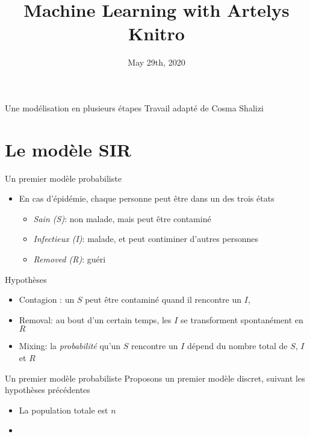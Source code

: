 \documentclass[10pt]{beamer}
\title{Machine Learning with Artelys Knitro}
\date{May 29th, 2020}
\begin{document}
\begin{frame}{Une modélisation en plusieurs étapes}
  Travail adapté de Cosma Shalizi
\end{frame}

\section{Le modèle SIR}

\begin{frame}{Un premier modèle probabiliste}
  \begin{itemize}
    \item En cas d'épidémie, chaque personne peut être dans un des trois états
      \begin{itemize}
        \item \emph{Sain (S)}: non malade, mais peut être contaminé
        \item \emph{Infectieux (I)}: malade, et peut contiminer d'autres personnes
        \item \emph{Removed (R)}: guéri
      \end{itemize}
  \end{itemize}

  \begin{block}{Hypothèses}
    \begin{itemize}
      \item Contagion : un $S$ peut être contaminé quand il rencontre un $I$,
      \item Removal: au bout d'un certain temps, les $I$ se transforment spontanément en $R$
      \item Mixing: la \emph{probabilité} qu'un $S$ rencontre un $I$ dépend du nombre total
        de $S$, $I$ et $R$
    \end{itemize}
  \end{block}
\end{frame}

\begin{frame}{Un premier modèle probabiliste}
  Proposons un premier modèle discret, suivant les hypothèses précédentes
  \begin{itemize}
    \item La population totale est $n$
    \item

  \end{itemize}

\end{frame}
\end{document}

